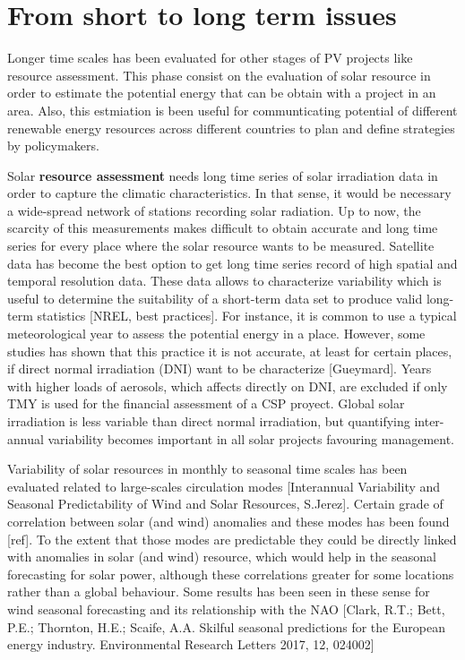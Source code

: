 \section{From short to long term issues}

Longer time scales has been evaluated for other stages of PV projects like resource assessment. This phase consist on the evaluation of solar resource in order to estimate the potential energy that can be obtain with a project in an area. Also, this estmiation is been useful for communticating potential of different renewable energy resources across different countries to plan and define strategies by policymakers.

Solar \textbf{resource assessment} needs long time series of solar irradiation data in order to capture the climatic characteristics. In that sense, it would be necessary a wide-spread network of stations recording solar radiation. Up to now, the scarcity of this measurements makes difficult to obtain accurate and long time series for every place where the solar resource wants to be measured. Satellite data has become the best option to get long time series record of high spatial and temporal resolution data. These data allows to characterize variability which is useful to determine the suitability of a short-term data set to produce valid long-term statistics [NREL, best practices]. For instance, it is common to use a typical meteorological year to assess the potential energy in a place. However, some studies has shown that this practice it is not accurate, at least for certain places, if direct normal irradiation (DNI) want to be characterize [Gueymard]. Years with higher loads of aerosols, which affects directly on DNI, are excluded if only TMY is used for the financial assessment of a CSP proyect. Global solar irradiation is less variable than direct normal irradiation, but quantifying inter-annual variability becomes important in all solar projects favouring management.


Variability of solar resources in monthly to seasonal time scales has been evaluated related to large-scales circulation modes [Interannual Variability and Seasonal Predictability of Wind and Solar Resources, S.Jerez]. Certain grade of correlation between solar (and wind) anomalies and these modes has been found [ref]. To the extent that those modes are predictable they could be directly linked with anomalies in solar (and wind) resource, which would help in the seasonal forecasting for solar power, although these correlations greater for some locations rather than a global behaviour. Some results has been seen in these sense for wind seasonal forecasting and its relationship with the NAO [Clark, R.T.; Bett, P.E.; Thornton, H.E.; Scaife, A.A. Skilful seasonal predictions for the European energy industry. Environmental Research Letters 2017, 12, 024002]


